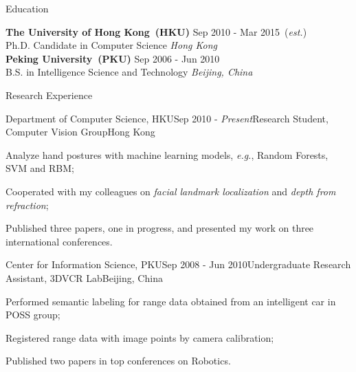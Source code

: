 \documentclass{cv_professional-en} %
\begin{document}

\begin{rSection}{Education}

{\bf The University of Hong Kong~(HKU)} \hfill Sep 2010 - Mar 2015~(\textit{est.}) \\ 
Ph.D. Candidate in Computer Science \hfill {\em Hong Kong}\smallskip \\
{\bf Peking University~(PKU)} \hfill Sep 2006 - Jun 2010 \\ 
B.S. in Intelligence Science and Technology \hfill {\em Beijing, China} 

\end{rSection}


\begin{rSection}{Research Experience}
    
\begin{rSubsection}{Department of Computer Science, HKU}{Sep 2010 - \textit{Present}}{Research Student, Computer Vision Group}{Hong Kong}
\item Analyze hand postures with machine learning models, \textit{e.g.}, Random Forests, SVM and RBM;
\item Cooperated with my colleagues on \textit{facial landmark localization} and \textit{depth from refraction};
\item Published three papers, one in progress, and presented my work on three international conferences.
\end{rSubsection}

\begin{rSubsection}{Center for Information Science, PKU}{Sep 2008 - Jun 2010}{Undergraduate Research Assistant, 3DVCR Lab}{Beijing, China}
    \item Performed semantic labeling for range data obtained from an intelligent car in POSS group;
    \item Registered range data with image points by camera calibration;
    \item Published two papers in top conferences on Robotics.
\end{rSubsection}

\end{rSection}
\end{document}
